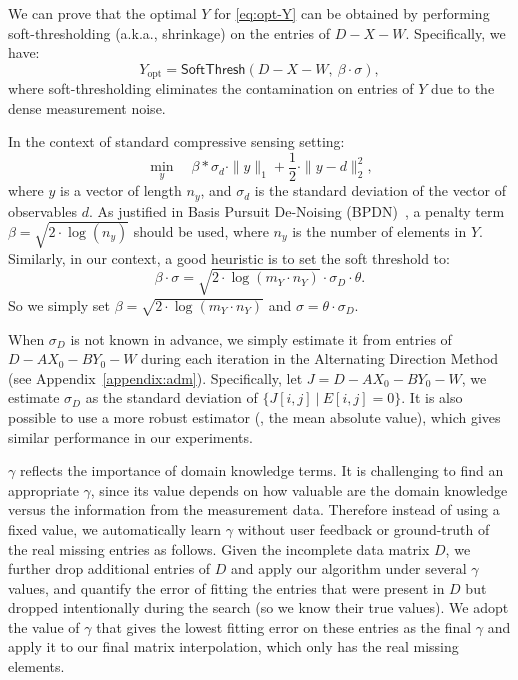 We can prove that the optimal $Y$ for \eqref{eq:opt-Y} can be
obtained by performing soft-thresholding (a.k.a., shrinkage) on the
entries of $D-X-W$. Specifically, we have:
\begin{equation}
Y_{\mathrm{opt}} = \mathsf{SoftThresh}(D-X-W,~\beta\cdot\sigma),
\label{eq:Y_opt}
\end{equation}
where soft-thresholding eliminates the contamination on entries of $Y$
due to the dense measurement noise.

In the context of standard compressive sensing setting:
\[
\min_y\quad \beta*\sigma_d\cdot\|y\|_1 + \frac{1}{2}\cdot\|y-d\|_2^2,
\]
where $y$ is a vector of length $n_y$, and $\sigma_d$ is the standard
deviation of the vector of observables $d$. As justified in Basis
Pursuit De-Noising (BPDN)~\cite{Chen98atomicdecomposition}, a penalty
term $\beta = \sqrt{2\cdot \log(n_y)}$ should be used, where $n_y$ is
the number of elements in $Y$.  Similarly, in our context, a good
heuristic is to set the soft threshold to:
\[
\beta\cdot \sigma = \sqrt{2\cdot\log(m_Y\cdot n_Y)}\cdot\sigma_D\cdot\theta.
\]
So we simply set $\beta=\sqrt{2\cdot\log(m_Y\cdot n_Y)}$ and
$\sigma=\theta \cdot\sigma_D$.

 When $\sigma_D$ is not known in advance,
we simply estimate it from entries of $D-AX_0-BY_0-W$ during each
iteration in the Alternating Direction Method (see
Appendix~\ref{appendix:adm}). Specifically, let $J=D-AX_0-BY_0-W$, we
estimate $\sigma_D$ as the standard deviation of
$\{J[i,j]~|~E[i,j]=0\}$.  It is also possible to use a more robust
estimator (\eg, the mean absolute value), which gives similar
performance in our experiments.

 $\gamma$ reflects the importance of
domain knowledge terms. It is challenging to find an appropriate
$\gamma$, since its value depends on how valuable are the domain
knowledge versus the information from the measurement data. Therefore
instead of using a fixed value, we automatically learn $\gamma$
without user feedback or ground-truth of the real missing entries as
follows. Given the incomplete data matrix $D$, we further drop
additional entries of $D$ and apply our algorithm under several
$\gamma$ values, and quantify the error of fitting the entries that
were present in $D$ but dropped intentionally during the search (so we
know their true values). We adopt the value of $\gamma$ that gives the
lowest fitting error on these entries as the final $\gamma$ and apply
it to our final matrix interpolation, which only has the real missing
elements.


